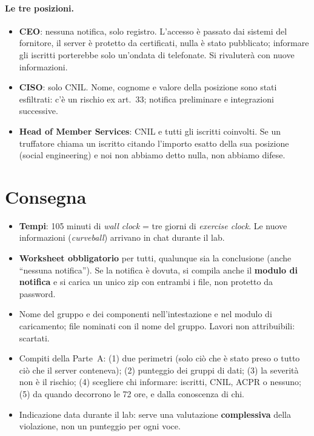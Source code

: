 \paragraph{Le tre posizioni.}
\begin{itemize}
  \item \textbf{CEO}: nessuna notifica, solo registro. L'accesso è passato dai sistemi del fornitore,
    il server è protetto da certificati, nulla è stato pubblicato; informare gli iscritti porterebbe
    solo un'ondata di telefonate. Si rivaluterà con nuove informazioni.
  \item \textbf{CISO}: solo CNIL. Nome, cognome e valore della posizione sono stati esfiltrati: c'è un
    rischio ex art.~33; notifica preliminare e integrazioni successive.
  \item \textbf{Head of Member Services}: CNIL e tutti gli iscritti coinvolti. Se un truffatore chiama
    un iscritto citando l'importo esatto della sua posizione (social engineering) e noi non abbiamo
    detto nulla, non abbiamo difese.
\end{itemize}

\section{Consegna}
\begin{itemize}
  \item \textbf{Tempi}: 105 minuti di \emph{wall clock} = tre giorni di \emph{exercise clock}. Le nuove
    informazioni (\emph{curveball}) arrivano in chat durante il lab.
  \item \textbf{Worksheet obbligatorio} per tutti, qualunque sia la conclusione (anche ``nessuna
    notifica''). Se la notifica è dovuta, si compila anche il \textbf{modulo di notifica} e si carica
    un unico zip con entrambi i file, non protetto da password.
  \item Nome del gruppo e dei componenti nell'intestazione e nel modulo di caricamento; file nominati
    con il nome del gruppo. Lavori non attribuibili: scartati.
  \item Compiti della Parte~A: (1) due perimetri (solo ciò che è stato preso o tutto ciò che il server
    conteneva); (2) punteggio dei gruppi di dati; (3) la severità non è il rischio; (4) scegliere chi
    informare: iscritti, CNIL, ACPR o nessuno; (5) da quando decorrono le 72 ore, e dalla conoscenza
    di chi.
  \item Indicazione data durante il lab: serve una valutazione \textbf{complessiva} della violazione,
    non un punteggio per ogni voce.
\end{itemize}

